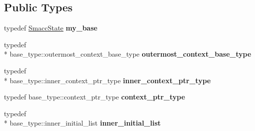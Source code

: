 \subsection*{Public Types}
\begin{DoxyCompactItemize}
\item 
\hypertarget{classsmacc_1_1SmaccState_aac18be8c1314b97ccfd34cb28d1bb386}{typedef \hyperlink{classsmacc_1_1SmaccState}{Smacc\-State} {\bfseries my\-\_\-base}}\label{classsmacc_1_1SmaccState_aac18be8c1314b97ccfd34cb28d1bb386}

\item 
\hypertarget{classsmacc_1_1SmaccState_aaf76bbe2aa9dd73e3284605f84ab4b16}{typedef \\*
base\-\_\-type\-::outermost\-\_\-context\-\_\-base\-\_\-type {\bfseries outermost\-\_\-context\-\_\-base\-\_\-type}}\label{classsmacc_1_1SmaccState_aaf76bbe2aa9dd73e3284605f84ab4b16}

\item 
\hypertarget{classsmacc_1_1SmaccState_a65a772c2e2039e9a59148ba6ffb54d8a}{typedef \\*
base\-\_\-type\-::inner\-\_\-context\-\_\-ptr\-\_\-type {\bfseries inner\-\_\-context\-\_\-ptr\-\_\-type}}\label{classsmacc_1_1SmaccState_a65a772c2e2039e9a59148ba6ffb54d8a}

\item 
\hypertarget{classsmacc_1_1SmaccState_a0e15b77514301039f6bc093a9d3f6425}{typedef base\-\_\-type\-::context\-\_\-ptr\-\_\-type {\bfseries context\-\_\-ptr\-\_\-type}}\label{classsmacc_1_1SmaccState_a0e15b77514301039f6bc093a9d3f6425}

\item 
\hypertarget{classsmacc_1_1SmaccState_acb4ac84bce421d39b594510a6b2df558}{typedef \\*
base\-\_\-type\-::inner\-\_\-initial\-\_\-list {\bfseries inner\-\_\-initial\-\_\-list}}\label{classsmacc_1_1SmaccState_acb4ac84bce421d39b594510a6b2df558}

\end{DoxyCompactItemize}
